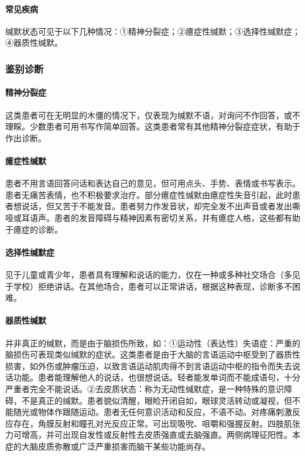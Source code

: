 \paragraph{常见疾病}

缄默状态可见于以下几种情况：①精神分裂症；②癔症性缄默；③选择性缄默症；④器质性缄默。

\subsubsection{鉴别诊断}

\paragraph{精神分裂症}

这类患者可在无明显的木僵的情况下，仅表现为缄默不语，对询问不作回答，或不理睬。少数患者可用书写作简单回答。这类患者常有其他精神分裂症症状，有助于作出诊断。

\paragraph{癔症性缄默}

患者不用言语回答问话和表达自己的意见，但可用点头、手势、表情或书写表示。患者无痛苦表情，也不积极要求治疗。部分癔症性缄默由癔症性失音引起，此时患者想说话，但又苦于不能发音。患者努力作发音状，却完全发不出声音或者发出嘶哑或耳语声。患者的发音障碍与精神因素有密切关系，并有癔症人格，这些都有助于癔症的诊断。

\paragraph{选择性缄默症}

见于儿童或青少年，患者具有理解和说话的能力，仅在一种或多种社交场合（多见于学校）拒绝讲话。在其他场合，患者可以正常讲话，根据这种表现，诊断多不困难。

\paragraph{器质性缄默}

并非真正的缄默，而是由于脑损伤所致，如：①运动性（表达性）失语症：严重的脑损伤可表现类似缄默的症状。这类患者是由于大脑的言语运动中枢受到了器质性损害，如外伤或肿瘤压迫，以致言语运动肌肉得不到言语运动中枢的指令而失去说话功能。患者能理解他人的说话，也很想说话。轻者能发单词而不能成语句，十分严重者完全不能说话。②去皮质状态：称为无动性缄默症，是一种特殊的意识障碍，不是真正的缄默。患者貌似清醒，眼睑开闭自如，眼球灵活转动或凝视，但不能随光或物体作跟随运动。患者无任何意识活动和反应，不语不动。对疼痛刺激反应存在，角膜反射和瞳孔对光反应正常。可出现吸吮、咀嚼和强握反射。四肢肌张力可增高，并可出现自发性或反射性去皮质强直或去脑强直。两侧病理征阳性。本症的大脑皮质弥散或广泛严重损害而脑干某些功能尚存。

